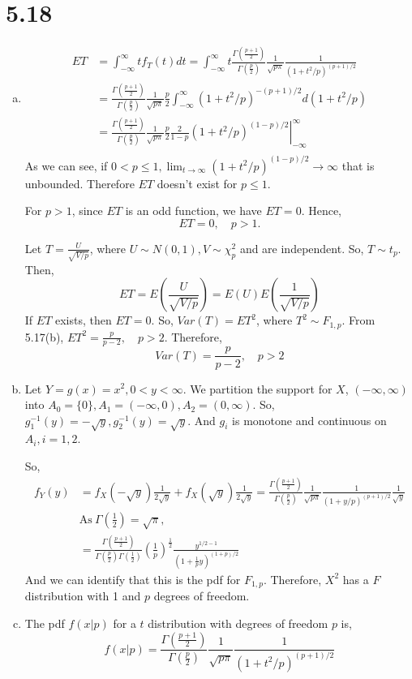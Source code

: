 \documentclass[letterpaper]{article}
\newcommand{\intii}{\int_{-\infty}^\infty}
\newcommand{\pbt}{\frac{p}{2}}
\begin{document}
\section*{5.18}
\begin{enumerate}[(a)]
\item 
\begin{align*}
ET & = \intii t f_T(t) dt = \intii t \frac{\Gamma(\frac{p+1}{2})}{\Gamma(\pbt)} \frac{1}{\sqrt{p\pi}} \frac{1}{(1+t^2/p)^{(p+1)/2}} \\
& = \frac{\Gamma(\frac{p+1}{2})}{\Gamma(\pbt)} \frac{1}{\sqrt{p\pi}} \frac{p}{2} \intii (1+t^2/p)^{-(p+1)/2} d(1+t^2/p) \\
& = \frac{\Gamma(\frac{p+1}{2})}{\Gamma(\pbt)} \frac{1}{\sqrt{p\pi}} \frac{p}{2} \frac{2}{1-p}  \left. (1+t^2/p)^{(1-p)/2}\right|_{-\infty}^\infty \\
\end{align*}
As we can see, if $0 < p \le 1, \lim_{t \to \infty} (1+t^2/p)^{(1-p)/2} \to \infty$ that is unbounded. Therefore $ET$ doesn't exist for $p \le 1$.

For $p > 1$, since $ET$ is an odd function, we have $ET = 0$. Hence,
\[
ET = 0, \quad p > 1.
\]

Let $T = \frac{U}{\sqrt{V/p}}$, where $U \sim N(0,1), V \sim \chi^2_p$ and are independent. So, $T \sim t_p$. Then,
\[
ET = E(\frac{U}{\sqrt{V/p}}) = E(U) E(\frac{1}{\sqrt{V/p}})
\]
If $ET$ exists, then $ET = 0$. So, $Var(T) = ET^2$, where $T^2 \sim F_{1, p}$. 
From 5.17(b), $ET^2 = \frac{p}{p-2}, \quad p > 2$. Therefore, 
\[
Var(T) = \frac{p}{p-2}, \quad p > 2
\]
\item
Let $Y = g(x) = x^2, 0 < y < \infty$. We partition the support for $X$, $(-\infty, \infty)$ into $A_0 = \{0\}, A_1 = (-\infty, 0), A_2 = (0, \infty)$. 
So, $g^{-1}_1(y) = -\sqrt{y}, g^{-1}_2(y) = \sqrt{y}$. And $g_i$ is monotone and continuous on $A_i, i = 1, 2$.

So,
\begin{align*}
f_Y(y) & = f_X(-\sqrt{y}) \frac{1}{2\sqrt{y}} + f_X(\sqrt{y}) \frac{1}{2\sqrt{y}} = \frac{\Gamma(\frac{p+1}{2})}{\Gamma(\pbt)} \frac{1}{\sqrt{p\pi}} \frac{1}{(1+y/p)^{(p+1)/2}} \frac{1}{\sqrt{y}} \\
& \text{As}~\Gamma(\frac{1}{2}) = \sqrt{\pi}, \\
& = \frac{\Gamma(\frac{p+1}{2})}{\Gamma(\pbt)\Gamma(\frac{1}{2})} \left(\frac{1}{p}\right)^\frac{1}{2} \frac{y^{1/2-1}}{\left(1+\frac{1}{p} y \right)^{(1+p)/2}}
\end{align*}
And we can identify that this is the pdf for $F_{1, p}$. Therefore, $X^2$ has a $F$ distribution with 1 and $p$ degrees of freedom.
\item
The pdf $f(x|p)$ for a $t$ distribution with degrees of freedom $p$ is,
\[
f(x|p) = \frac{\Gamma(\frac{p+1}{2})}{\Gamma(\pbt)} \frac{1}{\sqrt{p\pi}} \frac{1}{(1+t^2/p)^{(p+1)/2}}
\]


\end{enumerate}
\end{document}
